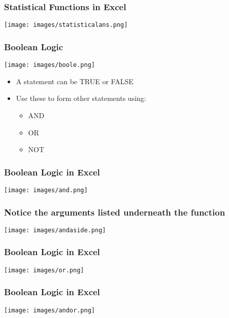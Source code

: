 \documentclass[11pt]{beamer}
\begin{document}
\begin{frame}
\begin{center}
 \frametitle{Statistical Functions in Excel}
\texttt{[image: images/statisticalans.png]}
\end{center}
\end{frame}

\begin{frame}
 \frametitle{Boolean Logic}
\begin{center}
\texttt{[image: images/boole.png]}
\end{center}
\begin{itemize}
\item A \alert{statement} can be \alert{TRUE} or \alert{FALSE}
\item Use these to form other statements using:
\begin{itemize}
\item \alert{AND} 
\item \alert{OR}
\item \alert{NOT}
\end{itemize}
\end{itemize}
\end{frame}

\begin{frame}
\begin{center}
 \frametitle{Boolean Logic in Excel}
\texttt{[image: images/and.png]}
\end{center}
\end{frame}

\begin{frame}
\begin{center}
 \frametitle{Notice the arguments listed underneath the function}
\texttt{[image: images/andaside.png]}
\end{center}
\end{frame}

\begin{frame}
\begin{center}
 \frametitle{Boolean Logic in Excel}
\texttt{[image: images/or.png]}
\end{center}
\end{frame}

\begin{frame}
\begin{center}
 \frametitle{Boolean Logic in Excel}
\texttt{[image: images/andor.png]}
\end{center}
\end{frame}
\end{document}
